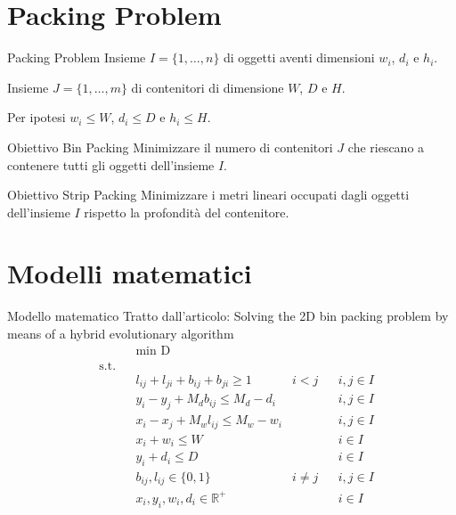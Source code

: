 \documentclass{beamer}
\begin{document}
\section{Packing Problem}
\begin{frame}{Packing Problem}
	Insieme $I = \{1,\dots,n\}$ di oggetti aventi dimensioni $w_{i}$, $d_{i}$ e $h_{i}$.	
														
	Insieme $J = \{1,\dots,m\}$ di contenitori di dimensione $W$, $D$ e $H$.
												
	Per ipotesi $w_{i} \leq W$, $d_{i} \leq D$ e $h_{i} \leq H$.
	\vspace{.5em}
	\begin{minipage}[c]{0.45\textwidth}
		\begin{alertblock}{Obiettivo Bin Packing}
			Minimizzare il numero di contenitori $J$ che riescano a contenere tutti gli oggetti dell'insieme $I$.
		\end{alertblock}	
	\end{minipage}
	\hfill
	\begin{minipage}[c]{0.45\textwidth}
		\begin{alertblock}{Obiettivo Strip Packing}
			Minimizzare i metri lineari occupati dagli oggetti dell'insieme $I$ rispetto la profondit\`a del contenitore.
		\end{alertblock}	
	\end{minipage}
\end{frame}


\section{Modelli matematici}
\begin{frame}{Modello matematico}
	Tratto dall'articolo: Solving the 2D bin packing problem by means of a hybrid evolutionary algorithm
	\begin{align*}
		& & &\underset{}{\text{min D}} \\
		& \text{s.t.} \\
		  &   &   & l_{ij} + l_{ji} + b_{ij} + b_{ji} \geq 1      & i < j    &   & i,j \in I \\
		  &   &   & y_i - y_j + M_d b_{ij} \leq M_d - d_i         &          &   & i,j \in I \\
		  &   &   & x_i - x_j + M_w l_{ij} \leq M_w - w_i         &          &   & i,j \in I \\
		  &   &   & x_i + w_i \leq W                              &          &   & i \in I   \\
		  &   &   & y_i + d_i \leq D                              &          &   & i \in I   \\
		  &   &   & b_{ij}, l_{ij} \in \{0,1\}                    & i \neq j &   & i,j \in I \\
		  &   &   & x_{i}, y_{i}, w_{i}, d_{i} \in \mathbb{R}^{+} &          &   & i \in I   
	\end{align*}
\end{frame}
\end{document}
